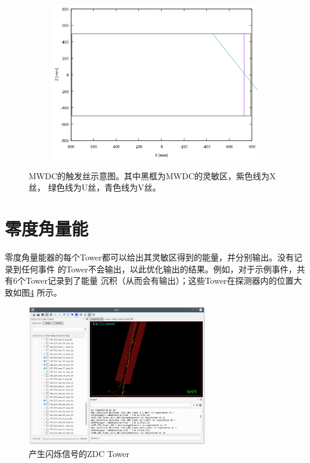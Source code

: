 \documentclass[bachelor,openany,oneside,color]{buaathesis}
\begin{document}
\begin{figure}
\begin{subfigure}[c]{0.3\linewidth}
		\label{fig:result:MWDC2}
	\end{subfigure}
	\begin{subfigure}[c]{0.3\linewidth}
		\includegraphics[width=\textwidth]{./resource/MWDC3-result.png}
		\label{fig:result:MWDC3}
	\end{subfigure}
	\caption{MWDC的触发丝示意图。其中黑框为MWDC的灵敏区，紫色线为X丝，
		绿色线为U丝，青色线为V丝。}
	\label{fig:result:MWDC}
\end{figure}

\section{零度角量能}

零度角量能器的每个Tower都可以给出其灵敏区得到的能量，并分别输出。没有记录到任何事件
的Tower不会输出，以此优化输出的结果。例如，对于示例事件，共有6个Tower记录到了能量
沉积（从而会有输出）；这些Tower在探测器内的位置大致如图\ref{fig:result:ZDC:Display}
所示。

\begin{figure}
	\centering
	\includegraphics[width=0.7\textwidth]{./resource/ZDC-Display.png}
	\caption{产生闪烁信号的ZDC Tower}\label{fig:result:ZDC:Display}
\end{figure}
\end{document}
